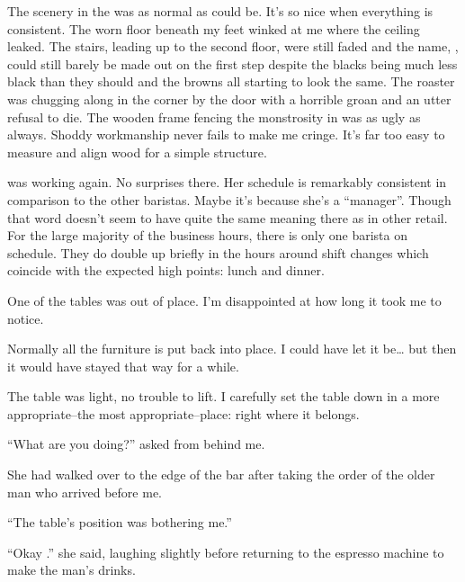 {}
\noindent
The scenery in the \cafe{} was as normal as could be.
It's so nice when everything is consistent.
The worn floor beneath my feet winked at me where the ceiling leaked.
The stairs, leading up to the second floor, were still faded and the name,
\cafeF, could still barely be made out on the first step despite
the blacks being much less black than they should and the browns all
starting to look the same. The roaster was chugging along
in the corner by the door with a horrible groan and an utter refusal to die.
The wooden frame fencing the monstrosity in was as ugly as always.
Shoddy workmanship never fails to make me cringe.
It's far too easy to measure and align wood for a simple structure.


\april{} was working again.  No surprises there.
Her schedule is remarkably consistent in comparison to the other baristas.
Maybe it's because she's a ``manager''.  Though that word doesn't seem to
have quite the same meaning there as in other retail.
For the large majority of the business hours, there is only one barista
on schedule.  They do double up briefly in the hours around shift changes
which coincide with the expected high points: lunch and dinner.


One of the tables was out of place.
I'm disappointed at how long it took me to notice.


Normally all the furniture is put back into place.
I could have let it be\ldots{} but then it would have
stayed that way for a while.


The table was light, no trouble to lift.
I carefully set the table down in a more
appropriate--the most appropriate--place:
right where it belongs.
\VV


``What are you doing?'' \april{} asked from behind me.
\VV


\noindent
She had walked over to the edge of the bar after taking the order
of the older man who arrived before me.
\VV


``The table's position was bothering me.''
\VV


``Okay \josh.'' she said, laughing slightly before returning to
the espresso machine to make the man's drinks.
\VV


